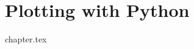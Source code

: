 \documentclass{beamer}
\begin{document}

\section{Plotting with Python}
{chapter.tex}





    
\end{document}

